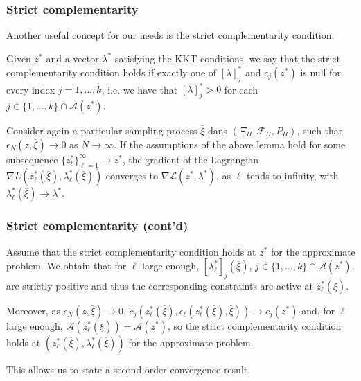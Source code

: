\begin{frame}
	\frametitle{Strict complementarity}
	
	Another useful concept for our needs is the strict complementarity condition.
	
	\begin{defi}
		Given $z^*$ and a vector $\lambda^*$ satisfying the KKT conditions, we say that the strict complementarity condition holds if exactly one of $[\lambda]_j^*$ and $c_j(z^*)$ is null for every index $j=1,\ldots,k$, i.e. we have that $[\lambda]_j^* > 0$ for each $j \in \lbrace 1,\ldots,k \rbrace \cap \mathcal{A}(z^*)$.
	\end{defi}
	
	\mbox{}
	
	Consider again a particular sampling process $\overline{\xi}$ dans $(\Xi_{\Pi}, \mathcal{F}_{\Pi}, P_{\Pi})$, such that $\epsilon_N (z, \overline{\xi} ) \rightarrow 0$ as $N \rightarrow \infty$. 
	If the assumptions of the above lemma hold for some subsequence $\lbrace z_{\ell}^* \rbrace_{\ell = 1}^{\infty} \rightarrow z^*$, the gradient of the Lagrangian $\nabla L\left( z^*_{\ell} ( \overline{\xi} ), \lambda_{\ell}^* ( \overline{\xi} ) \right)$ converges to $\nabla \mathcal{L} ( z^*, \lambda^* )$, as $\ell$ tends to infinity, with $\lambda_{\ell}^*(\overline{\xi}) \rightarrow \lambda^*$.
	
\end{frame}

\begin{frame}
	\frametitle{Strict complementarity (cont'd)}
	
	Assume that the strict complementarity condition holds at $z^*$ for the approximate problem.
	We obtain that for $\ell$ large enough,
	$[\lambda^*_{\ell}]_j(\overline{\xi})$, $j \in \lbrace 1,\ldots,k
	\rbrace \cap \mathcal{A} ( z^* ) $, are strictly positive and thus the corresponding constraints are active at $z^*_{\ell}(\overline{\xi})$.
	
	\mbox{}
	
	Moreover, as $\epsilon_N (z, \overline{\xi} ) \rightarrow 0$,
	$\hat{c}_j \left( z^*_{\ell}(\overline{\xi}),
	\epsilon_{\ell}(z^*_{\ell}(\overline{\xi}),\overline{\xi}) \right) \rightarrow
	c_j ( z^* )$ and, for $\ell$ large enough,
	$\mathcal{A} \left( z^*_{\ell}(\overline{\xi}) \right) = \mathcal{A} (
	z^* )$, so the strict complementarity condition holds at $\left(
	z^*_{\ell}(\overline{\xi}), \lambda_{\ell}^*(\overline{\xi})
	\right)$ for the approximate problem.
	
	\mbox{}
	
	This allows us to state a second-order convergence result.
	
\end{frame}

